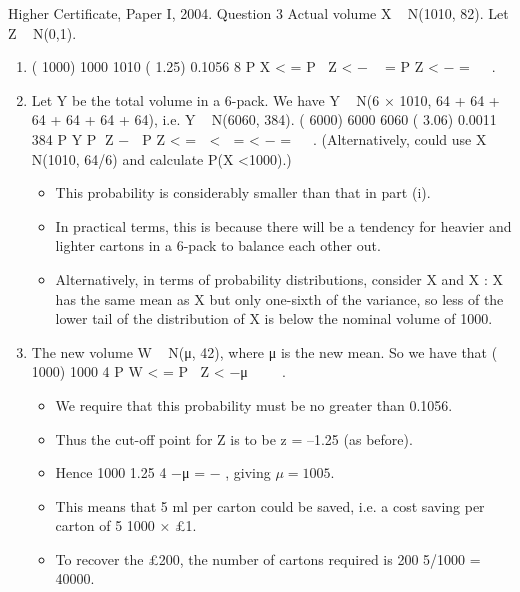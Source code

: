 \documentclass[a4paper,12pt]{article}
\begin{document}
Higher Certificate, Paper I, 2004. Question 3
Actual volume X ~ N(1010, 82). Let Z ~ N(0,1).
\begin{enumerate}
\item  ( 1000) 1000 1010 ( 1.25) 0.1056
8
P X < = P Z < −  = P Z < − =
 
.
\item  Let Y be the total volume in a 6-pack.
We have Y ~ N(6 × 1010, 64 + 64 + 64 + 64 + 64 + 64), i.e. Y ~ N(6060, 384).
( 6000) 6000 6060 ( 3.06) 0.0011
384
P Y P Z −  P Z < =  <  = < − =
 
.
(Alternatively, could use X ~ N(1010, 64/6) and calculate P(X <1000).)
\begin{itemize}
    \item This probability is considerably smaller than that in part (i).
    \item In practical terms, this is
because there will be a tendency for heavier and lighter cartons in a 6-pack to balance
each other out. 
\item Alternatively, in terms of probability distributions, consider X and X :
X has the same mean as X but only one-sixth of the variance, so less of the lower tail
of the distribution of X is below the nominal volume of 1000.
\end{itemize}

\item The new volume W ~ N(μ, 42), where μ is the new mean. So we have that
( 1000) 1000
4
P W < = P Z < −μ 
 
. 

\begin{itemize}
\item 
We require that this probability must be no greater
than 0.1056.
\item Thus the cut-off point for Z is to be z = –1.25 (as before).
\item Hence
1000 1.25
4
−μ = − , giving $\mu = 1005$.
\item This means that 5 ml per carton could be saved, i.e. a cost saving per carton of
5
1000
× £1. 
\item To recover the £200, the number of cartons required is 200
5/1000
= 40000.
\end{itemize}

\end{enumerate}
\end{document}
